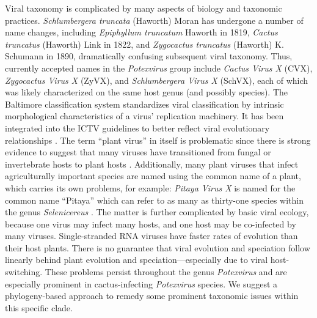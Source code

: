 \documentclass[fleqn,10pt,lineno]{wlpeerj}
\begin{document}
Viral taxonomy is complicated by many aspects of biology and taxonomic practices.
\textit{Schlumbergera truncata} (Haworth) Moran has undergone a number of name changes, including \textit{Epiphyllum truncatum} Haworth in 1819, \textit{Cactus truncatus} (Haworth) Link in 1822, and \textit{Zygocactus truncatus} (Haworth) K. Schumann in 1890, dramatically confusing subsequent viral taxonomy.
Thus, currently accepted names in the \textit{Potexvirus} group include \textit{Cactus Virus X} (CVX), \textit{Zygocactus Virus X} (ZyVX), and \textit{Schlumbergera Virus X} (SchVX), each of which was likely characterized on the same host genus (and possibly species). %
The Baltimore classification system standardizes viral classification by intrinsic morphological characteristics of a virus' replication machinery. 
It has been integrated into the ICTV guidelines to better reflect viral evolutionary relationships \citep{ictv2020}.
The term ``plant virus'' in itself is problematic since there is strong evidence to suggest that many viruses have transitioned from fungal or invertebrate hosts to plant hosts \citep{lefeuvre2019}. %
Additionally, many plant viruses that infect agriculturally important species are named using the common name of a plant, which carries its own problems, for example: \textit{Pitaya Virus X} is named for the common name ``Pitaya'' which can refer to as many as thirty-one species within the genus \textit{Selenicereus} \citep{korotkova_phylogenetic_2017,guerrero_phylogenetic_2019,le_bellec_12_2011}. 
The matter is further complicated by basic viral ecology, because one virus may infect many hosts, and one host may be co-infected by many viruses. 
Single-stranded RNA viruses have faster rates of evolution than their host plants. %
There is no guarantee that viral evolution and speciation follow linearly behind plant evolution and speciation---especially due to viral host-switching.
These problems persist throughout the genus \textit{Potexvirus} and are especially prominent in cactus-infecting \textit{Potexvirus} species.
We suggest a phylogeny-based approach to remedy some prominent taxonomic issues within this specific clade.
\end{document}
